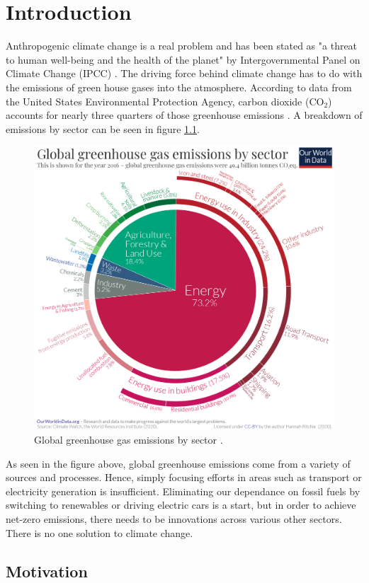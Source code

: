 \chapter{Introduction}

Anthropogenic climate change is a real problem and has been stated as "a threat to human well-being and the health of the planet" by Intergovernmental Panel on Climate Change (IPCC) \cite{ipcc_2022}. The driving force behind climate change has to do with the emissions of green house gases into the atmosphere. According to data from the United States Environmental Protection Agency, carbon dioxide (CO$_2$) accounts for nearly three quarters of those greenhouse emissions \cite{epa_2019}. A breakdown of emissions by sector can be seen in figure \ref{fig:green_house_gas_emissions}.

\begin{figure}[h!]
	\centering
	\includegraphics[width=0.7\linewidth]{chapter_1/figures/emissions.png}
	\caption{Global greenhouse gas emissions by sector \cite{ritchie_roser_2020}.}
	\label{fig:green_house_gas_emissions}
\end{figure} 

As seen in the figure above, global greenhouse emissions come from a variety of sources and processes. Hence, simply focusing efforts in areas such as transport or electricity generation is insufficient. Eliminating our dependance on fossil fuels by switching to renewables or driving electric cars is a start, but in order to achieve net-zero emissions, there needs to be innovations across various other sectors. There is no one solution to  climate change.

\section{Motivation}

